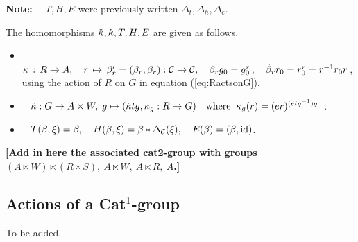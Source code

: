 \noindent
{\bf Note:}~~ $T,H,E$ were previously written $\Delta_t,\Delta_h,\Delta_e$. 

\bigskip\noindent
The homomorphisms 
$\ddot{\kappa}, \dot{\kappa}, T, H, E$ are given as follows.
\begin{itemize}
\item~
$\dot{\kappa} \,:\, R \to A, \quad
r \,\mapsto\, \beta'_r = (\bar{\beta}_r,\dot{\beta}_r) : \mathcal{C} \to \mathcal{C},
\quad  \bar{\beta}_r g_0 = g_0^r\,,
\quad  \dot{\beta}_r r_0 = r_0^r = r^{-1}r_0r$\,,\\
using the action of $R$ on $G$ in equation (\ref{eq:RactsonG}).
\item~
$\ddot{\kappa} : G \to A \ltimes W,\;
g \mapsto (\dot{\kappa} tg, \kappa_g : R \to G)
\quad\mbox{where}\;\;  \kappa_g(r) = (er)^{(etg^{-1})g}$~.
\item~
$T(\beta,\xi) = \beta, \quad
H(\beta,\xi) = \beta \ast \Delta_{\mathcal{C}}(\xi), \quad
E(\beta) = (\beta,\mathrm{id})$.
\end{itemize}

\bigskip\noindent
{\bf [Add in here the associated cat2-group with groups 
$(A \ltimes W) \ltimes (R \ltimes S),~
A \ltimes W,~ A \ltimes R,~ A$.]}







\subsection{Actions of a Cat$^1$-group}

\begin{defn}
To be added.
\end{defn}
